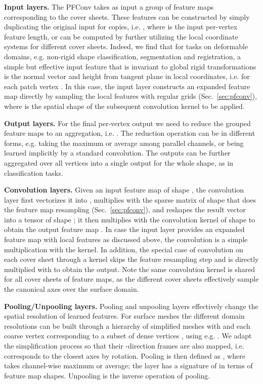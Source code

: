 \documentclass[10pt,twocolumn,letterpaper]{article}
\begin{document}
\textbf{Input layers.} 
The PFConv takes as input a group of  feature maps corresponding to the  cover sheets. These features can be constructed by simply duplicating the original input for  copies, i.e. , where  is the input per-vertex feature length, or can be computed by further utilizing the local coordinate systems for different cover sheets. 
Indeed, we find that for tasks on deformable domains, e.g. non-rigid shape classification, segmentation and registration, a simple but effective input feature that is invariant to global rigid transformations is the normal vector and height from tangent plane in local coordinates, i.e.  for each patch vertex . 
In this case, the input layer constructs an expanded  feature map directly by sampling the local features with regular grids (Sec.~\ref{sec:pfconv}), where  is the spatial shape of the subsequent convolution kernel to be applied.

\textbf{Output layers.}
For the final per-vertex output we need to reduce the grouped feature maps to an aggregation, i.e. .
The reduction operation can be in different forms, e.g. taking the maximum or average among  parallel channels, or being learned implicitly by a standard  convolution. 
The outputs can be further aggregated over all vertices into a single output for the whole shape, as in classification tasks.

\textbf{Convolution layers.}
Given an input feature map  of shape , the convolution layer first
vectorizes it into , multiplies with the sparse matrix  of shape  that does the feature map resampling (Sec.~\ref{sec:pfconv}), and reshapes the result vector into a tensor of shape ; it then multiplies with the convolution kernel of shape  to obtain the output feature map .
In case the input layer provides an expanded feature map with local features as discussed above, the convolution is a simple multiplication with the kernel.
In addition, the special case of  convolution on each cover sheet through a  kernel skips the feature resampling step and is directly multiplied with  to obtain the output.
Note the same convolution kernel is shared for all  cover sheets of feature maps, as the different cover sheets effectively sample the canonical axes over the surface domain.

\textbf{Pooling/Unpooling layers.}
Pooling and unpooling layers effectively change the spatial resolution of learned features.
For surface meshes the different domain resolutions can be built through a hierarchy of simplified meshes  with  and each coarse vertex  corresponding to a subset of dense vertices , using e.g. \cite{Garland:1997:QEM,Hoppe:1996:PM}.
We adapt the simplification process so that their -direction frames are also mapped, i.e.  corresponds to  the closest axes by rotation.
Pooling is then defined as , where  takes channel-wise maximum or average; the layer has a signature of  in terms of feature map shapes. Unpooling is the inverse operation of pooling.
\end{document}
